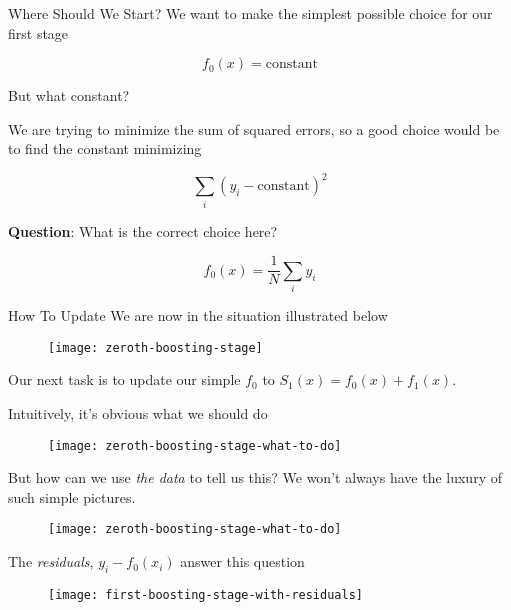 \begin{frame}{Where Should We Start?}
We want to make the simplest possible choice for our first stage

$$ f_0(x) = \text{constant} $$

But what constant?
\end{frame}
%

\begin{frame}
We are trying to minimize the sum of squared errors, so a good choice would be to find the constant minimizing

$$ \sum_i \left( y_i - \text{constant} \right)^2 $$

\textbf{Question}: What is the correct choice here?
\end{frame}
%

\begin{frame}
$$ f_0(x) = \frac{1}{N} \sum_i y_i $$
\end{frame}
%

\begin{frame}{How To Update}
We are now in the situation illustrated below

  \begin{figure}
    \texttt{[image: zeroth-boosting-stage]}
  \end{figure}

Our next task is to update our simple $f_0$ to $S_1(x) = f_0(x) + f_1(x)$.

\end{frame}
%

\begin{frame}
Intuitively, it's obvious what we should do

  \begin{figure}
    \texttt{[image: zeroth-boosting-stage-what-to-do]}
  \end{figure}
\end{frame}
%

\begin{frame}
But how can we use \textit{the data} to tell us this?  We won't always have the luxury of such simple pictures.

  \begin{figure}
    \texttt{[image: zeroth-boosting-stage-what-to-do]}
  \end{figure}
  
\end{frame}
%

\begin{frame}
The \textit{residuals}, $y_i - f_0(x_i)$ answer this question

  \begin{figure}
    \texttt{[image: first-boosting-stage-with-residuals]}
  \end{figure}
\end{frame}
%

